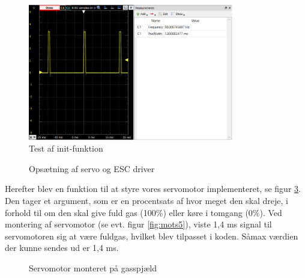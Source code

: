 \begin{figure}[h]
  \centering
  \includegraphics[width=0.8\textwidth]{./figurer/mots4.png}
  \caption{Test af init-funktion}
  \label{fig:mots4}
\end{figure}
\clearpage
\begin{figure}[h]
  \centering
    
  \caption{Opsætning af servo og ESC driver}
  \label{fig:kodes1}
\end{figure}
\clearpage

Herefter blev en funktion til at styre vores servomotor implementeret, se figur \ref{fig:kodes2}. Den tager et argument, som er en procentsats af hvor meget den skal dreje, i forhold til om den skal give fuld gas (100\%) eller køre i tomgang (0\%). Ved montering af servomotor (se evt. figur \ref{fig:mots5}), viste 1,4 ms signal til servomotoren sig at være fuldgas, hvilket blev tilpasset i koden. Såmax værdien der kunne sendes ud er 1,4 ms.

%   

\begin{figure}[h]
  \centering
  
  \caption{Servomotor monteret på gasspjæld}
  \label{fig:kodes2}
\end{figure}

